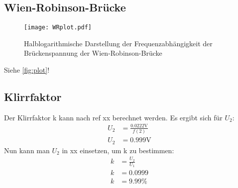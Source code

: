 \subsection{Wien-Robinson-Brücke}

\begin{figure}
  \centering
  \texttt{[image: WRplot.pdf]}
  \caption{Halblogarithmische Darstellung der Frequenzabhängigkeit der Brückenspannung der Wien-Robinson-Brücke}
  \label{fig:plot}
\end{figure}

Siehe \autoref{fig:plot}!
\subsection{Klirrfaktor}
Der Klirrfaktor k kann nach ref xx berechnet werden. Es ergibt sich für $U_2$:
\begin{align}
U_2&=\frac{0.0222\si{\volt}}{f(2)}\\
U_2&=0.999\si{\volt}
\end{align}
Nun kann man $U_2$ in xx einsetzen, um k zu bestimmen:
\begin{align}
  k&=\frac{U_2}{U_1}\\
  k&=0.0999\\
  k&=9.99\%
\end{align}
  
